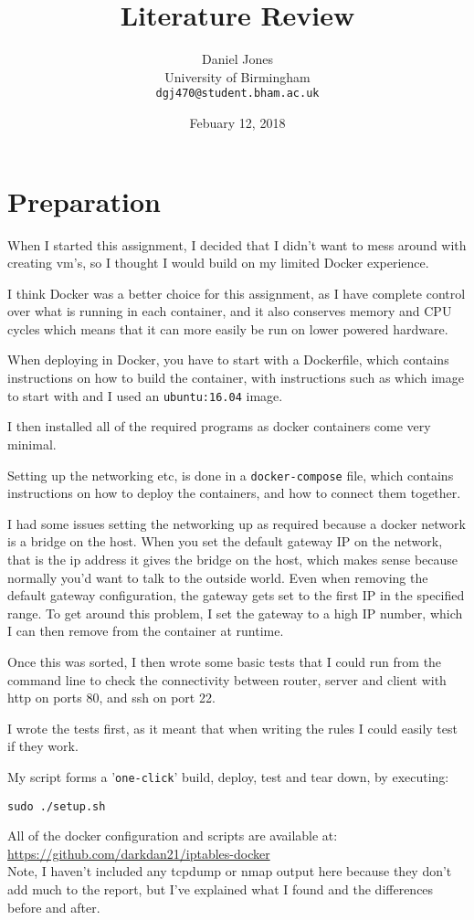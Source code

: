 \documentclass[12pt]{article}
\title{Literature Review}
\author{Daniel Jones\\
  \small{University of Birmingham}\\
  \small{\texttt{dgj470@student.bham.ac.uk}}
}
\date{Febuary 12, 2018}
\begin{document}
\maketitle
\tableofcontents
\newpage
\section{Preparation}
When I started this assignment, I decided that I didn't want to mess around with creating vm's, so I thought I would build on my limited Docker experience.

I think Docker was a better choice for this assignment, as I have complete control over what is running in each container, and it also conserves memory and CPU cycles \- which means that it can more easily be run on lower powered hardware.

When deploying in Docker, you have to start with a Dockerfile, which contains instructions on how to build the container, with instructions such as which image to start with and I used an \texttt{ubuntu:16.04} image.

I then installed all of the required programs \- as docker containers come very minimal.

Setting up the networking etc, is done in a \texttt{docker-compose} file, which contains instructions on how to deploy the containers, and how to connect them together.

I had some issues setting the networking up as required because a docker network is a bridge on the host. When you set the default gateway IP on the network, that is the ip address it gives the bridge on the host, which makes sense because normally you'd want to talk to the outside world. Even when removing the default gateway configuration, the gateway gets set to the first IP in the specified range. To get around this problem, I set the gateway to a high IP number, which I can then remove from the container at runtime.

Once this was sorted, I then wrote some basic tests that I could run from the command line to check the connectivity between router, server and client with http on ports 80, and ssh on port 22.

I wrote the tests first, as it meant that when writing the rules I could easily test if they work.

My script forms a '\texttt{one-click}' build, deploy, test and tear down, by executing:
\begin{verbatim}sudo ./setup.sh\end{verbatim}
All of the docker configuration and scripts are available at: \\
\url{https://github.com/darkdan21/iptables-docker}\\
Note, I haven't included any tcpdump or nmap output here because they don't add much to the report, but I've explained what I found and the differences before and after.
\end{document}
